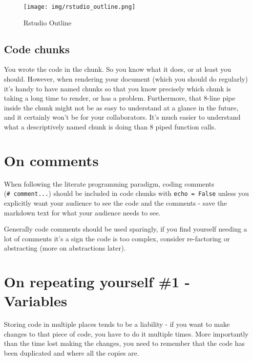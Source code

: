 \documentclass[
  letterpaper,
  DIV=11,
  numbers=noendperiod]{scrreprt}
\begin{document}
\begin{figure}[H]

{\centering \texttt{[image: img/rstudio\_outline.png]}

}

\caption{Rstudio Outline}

\end{figure}%

\subsection{Code chunks}\label{code-chunks}

You wrote the code in the chunk. So you know what it does, or at least
you should. However, when rendering your document (which you should do
regularly) it's handy to have named chunks so that you know precisely
which chunk is taking a long time to render, or has a problem.
Furthermore, that 8-line pipe inside the chunk might not be as easy to
understand at a glance in the future, and it certainly won't be for your
collaborators. It's much easier to understand what a descriptively named
chunk is doing than 8 piped function calls.

\section{On comments}\label{on-comments}

When following the literate programming paradigm, coding comments
(\texttt{\#\ comment...}) should be included in code chunks with
\texttt{echo\ =\ False} unless you explicitly want your audience to see
the code and the comments - save the markdown text for what your
audience needs to see.

Generally code comments should be used sparingly, if you find yourself
needing a lot of comments it's a sign the code is too complex, consider
re-factoring or abstracting (more on abstractions later).

\section{On repeating yourself \#1 -
Variables}\label{on-repeating-yourself-1---variables}

Storing code in multiple places tends to be a liability - if you want to
make changes to that piece of code, you have to do it multiple times.
More importantly than the time lost making the changes, you need to
remember that the code has been duplicated and where all the copies are.
\end{document}
